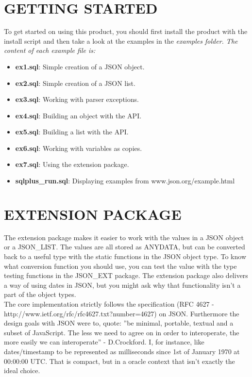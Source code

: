 \documentclass[11pt,twocolumn, a4paper]{article}
\begin{document}
\section*{GETTING STARTED}
To get started on using this product, you should first install the product with the install script and then take a look at the examples in the \em examples \em folder. The content of each example file is:
\begin{itemize}
\item \textbf{ex1.sql}: Simple creation of a JSON object. 
\item \textbf{ex2.sql}: Simple creation of a JSON list. 
\item \textbf{ex3.sql}: Working with parser exceptions.
\item \textbf{ex4.sql}: Building an object with the API.
\item \textbf{ex5.sql}: Building a list with the API.
\item \textbf{ex6.sql}: Working with variables as copies.
\item \textbf{ex7.sql}: Using the extension package.
\item \textbf{sqlplus\_run.sql}: Displaying examples from www.json.org/example.html
\end{itemize}

\section*{EXTENSION PACKAGE}
The extension package makes it easier to work with the values in a JSON object or a JSON\_LIST. The values are all stored as ANYDATA, but can be converted back to a useful type with the static functions in the JSON object type. To know what conversion function you should use, you can test the value with the type testing functions in the JSON\_EXT package. The extension package also delivers a way of using dates in JSON, but you might ask why that functionality isn't a part of the object types. \\
The core implementation strictly follows the specification (RFC 4627 - http://www.ietf.org/rfc/rfc4627.txt?number=4627) on JSON. Furthermore the design goals with JSON were to, quote: ''be minimal, portable, textual and a subset of JavaScript. The less we need to agree on in order to interoperate, the more easily we can interoperate'' - D.Crockford. I, for instance, like dates/timestamp to be represented as milliseconds since 1st of January 1970 at 00:00:00 UTC. That is compact, but in a oracle context that isn't exactly the ideal choice. 
\end{document}
